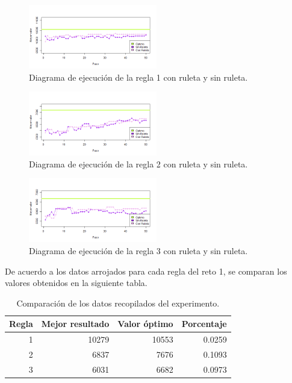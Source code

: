 \documentclass[12pt]{amsart}
\begin{document}
\begin{figure}[h!]
    \centering
    \includegraphics[width=0.5\textwidth]{t10_r1regla1.png}
    \caption{Diagrama de ejecución de la regla 1 con ruleta y sin ruleta.}
    \label{fig4}
\end{figure}

\begin{figure}[h!]
    \centering
    \includegraphics[width=0.5\textwidth]{t10_r1regla2.png}
    \caption{Diagrama de ejecución de la regla 2 con ruleta y sin ruleta.}
    \label{fig5}
\end{figure}

\clearpage
\begin{figure}[h!]
    \centering
    \includegraphics[width=0.5\textwidth]{t10_r1regla3.png}
    \caption{Diagrama de ejecución de la regla 3 con ruleta y sin ruleta.}
    \label{fig6}
\end{figure}


De acuerdo a los datos arrojados para cada regla del reto 1, se comparan los valores obtenidos en la siguiente tabla.

\begin{table}[h!]
    \caption{Comparación de los datos recopilados del experimento.}
    \label{datos2}
    \centering
    \begin{tabular}{|r|r|r|r|}
       \hline
        Regla&Mejor resultado&Valor óptimo&Porcentaje\\
        \hline
        1&10279 & 10553 & 0.0259 \\
        2&6837 & 7676 & 0.1093 \\
        3&6031 & 6682 & 0.0973 \\
        \hline
    \end{tabular}
\end{table}
\end{document}
